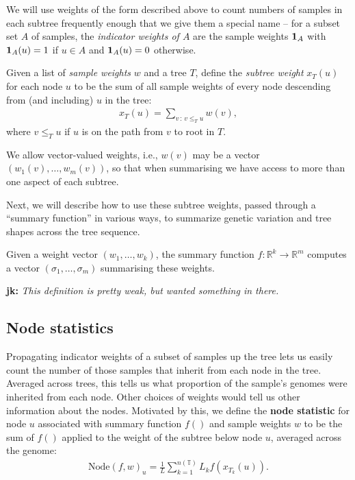 \documentclass{article}
\newcommand{\node}{\mbox{Node}} %
\newcommand{\treeseq}{\mathbb{T}} %
\newcommand{\iw}{w} %
\newcommand{\nw}{x} %
\newcommand{\jk}[1]{{\color{red}\textbf{jk:} \it #1}}
\begin{document}
We will use weights of the form described above to count numbers of samples in each subtree
frequently enough that we give them a special name --
for a subset set $A$ of samples,
the \emph{indicator weights of $A$} are the sample weights $\mathbf{1}_A$ with
$\mathbf{1}_A(u) = 1$ if $u \in A$ and $\mathbf{1}_A(u) = 0$ otherwise.

\begin{definition}
    Given a list of \emph{sample weights} $w$ and a tree $T$,
    define the \emph{subtree weight} $\nw_T(u)$ for each node $u$ to be the sum of all sample weights
    of every node descending from (and including) $u$ in the tree:
    \begin{align*}
        \nw_T(u) = \sum_{v \,:\, v \le_T u} \iw(v) ,
    \end{align*}
    where $v \le_T u$ if $u$ is on the path from $v$ to root in $T$.
\end{definition}

We allow vector-valued weights,
i.e., $\iw(v)$ may be a vector $(\iw_1(v), \ldots, \iw_m(v))$,
so that when summarising we have access to more than one aspect of each subtree.

Next, we will describe how to use these subtree weights,
passed through a ``summary function'' in various ways,
to summarize genetic variation and tree shapes across the tree sequence.

\begin{definition}
    Given a weight vector $(w_1, \dots, w_k)$, the summary function
    $f: \mathbb{R}^k \rightarrow \mathbb{R}^m$ computes a vector
    $(\sigma_1, \dots, \sigma_m)$ summarising these weights.
\end{definition}


\jk{This definition is pretty weak, but wanted something in there.}


\subsection*{Node statistics}

Propagating indicator weights of a subset of samples up the tree
lets us easily count the number of those samples that inherit from each node in
the tree. Averaged across trees,
this tells us what proportion of the sample's genomes were inherited from each node.
Other choices of weights would tell us other information about the nodes.
Motivated by this, we define the
\textbf{node statistic} for node $u$
associated with summary function $f()$ and sample weights $\iw$
to be the sum of $f()$ applied to the weight of the subtree below node $u$,
averaged across the genome:
\begin{align}
    \node(f, \iw)_u
    =
    \frac{1}{L} \sum_{k=1}^{n(\treeseq)} L_k f(\nw_{T_k}(u)).
\end{align}
\end{document}

